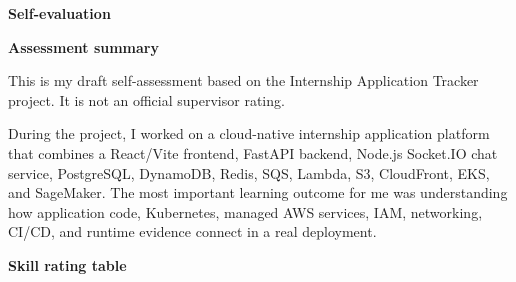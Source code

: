 \vspace{0.5em}\noindent\textbf{Self-evaluation}\par

\vspace{0.5em}\noindent\textbf{Assessment summary}\par

This is my draft self-assessment based on the Internship Application
Tracker project. It is not an official supervisor rating.

During the project, I worked on a cloud-native internship application
platform that combines a React/Vite frontend, FastAPI backend, Node.js
Socket.IO chat service, PostgreSQL, DynamoDB, Redis, SQS, Lambda, S3,
CloudFront, EKS, and SageMaker. The most important learning outcome for
me was understanding how application code, Kubernetes, managed AWS
services, IAM, networking, CI/CD, and runtime evidence connect in a real
deployment.

\vspace{0.5em}\noindent\textbf{Skill rating table}\par

